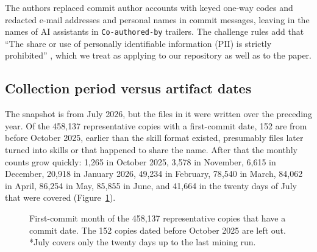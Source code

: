 \documentclass[11pt]{article}
\begin{document}
The authors replaced commit author accounts with keyed one-way codes and redacted e-mail addresses and personal names in
commit messages, leaving in the names of AI assistants in \texttt{Co-authored-by} trailers. The challenge rules add that
``The share or use of personally identifiable information (PII) is strictly prohibited'' \cite{msr2027call}, which we treat
as applying to our repository as well as to the paper.

\subsection{Collection period versus artifact dates}
The snapshot is from July 2026, but the files in it were written over the preceding year. Of the 458{,}137 representative
copies with a first-commit date, 152 are from before October 2025, earlier than the skill format existed, presumably files
later turned into skills or that happened to share the name. After that the monthly counts grow quickly:
1{,}265 in October 2025, 3{,}578 in November, 6{,}615 in December, 20{,}918 in January 2026, 49{,}234 in February, 78{,}540
in March, 84{,}062 in April, 86{,}254 in May, 85{,}855 in June, and 41{,}664 in the twenty days of July that were covered
(Figure~\ref{fig:months}).

\begin{figure}[h]
\centering
{}
\caption{First-commit month of the 458{,}137 representative copies that have a commit date. The 152 copies dated before October 2025 are left out. *July covers only the twenty days up to the last mining run.}
\label{fig:months}
\end{figure}
\end{document}
